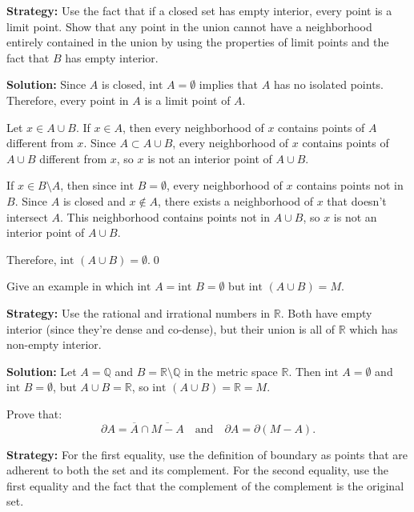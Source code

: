\noindent\textbf{Strategy:} Use the fact that if a closed set has empty interior, every point is a limit point. Show that any point in the union cannot have a neighborhood entirely contained in the union by using the properties of limit points and the fact that $B$ has empty interior.

\bigskip\noindent\textbf{Solution:} Since $A$ is closed, $\text{int } A = \emptyset$ implies that $A$ has no isolated points. Therefore, every point in $A$ is a limit point of $A$.

Let $x \in A \cup B$. If $x \in A$, then every neighborhood of $x$ contains points of $A$ different from $x$. Since $A \subset A \cup B$, every neighborhood of $x$ contains points of $A \cup B$ different from $x$, so $x$ is not an interior point of $A \cup B$.

If $x \in B \setminus A$, then since $\text{int } B = \emptyset$, every neighborhood of $x$ contains points not in $B$. Since $A$ is closed and $x \notin A$, there exists a neighborhood of $x$ that doesn't intersect $A$. This neighborhood contains points not in $A \cup B$, so $x$ is not an interior point of $A \cup B$.

Therefore, $\text{int } (A \cup B) = \emptyset$.\qed


\begin{problembox}
Give an example in which \(\text{int } A = \text{int } B = \emptyset\) but \(\text{int } (A \cup B) = M\).
\end{problembox}

\noindent\textbf{Strategy:} Use the rational and irrational numbers in $\mathbb{R}$. Both have empty interior (since they're dense and co-dense), but their union is all of $\mathbb{R}$ which has non-empty interior.

\bigskip\noindent\textbf{Solution:} Let $A = \mathbb{Q}$ and $B = \mathbb{R} \setminus \mathbb{Q}$ in the metric space $\mathbb{R}$. Then $\text{int } A = \emptyset$ and $\text{int } B = \emptyset$, but $A \cup B = \mathbb{R}$, so $\text{int } (A \cup B) = \mathbb{R} = M$.



\begin{problembox}
Prove that:
\[
\partial A = \overline{A} \cap \overline{M - A} \quad \text{and} \quad \partial A = \partial(M - A).
\]
\end{problembox}

\noindent\textbf{Strategy:} For the first equality, use the definition of boundary as points that are adherent to both the set and its complement. For the second equality, use the first equality and the fact that the complement of the complement is the original set.

